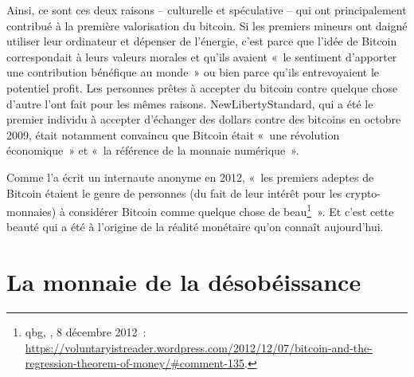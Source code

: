 Ainsi, ce sont ces deux raisons -- culturelle et spéculative -- qui ont principalement contribué à la première valorisation du bitcoin. Si les premiers mineurs ont daigné utiliser leur ordinateur et dépenser de l'énergie, c'est parce que l'idée de Bitcoin correspondait à leurs valeurs morales et qu'ils avaient «~le sentiment d'apporter une contribution bénéfique au monde~» ou bien parce qu'ils entrevoyaient le potentiel profit. Les personnes prêtes à accepter du bitcoin contre quelque chose d'autre l'ont fait pour les mêmes raisons. NewLibertyStandard, qui a été le premier individu à accepter d'échanger des dollars contre des bitcoins en octobre 2009, était notamment convaincu que Bitcoin était «~une révolution économique~» et «~la référence de la monnaie numérique~». %

Comme l'a écrit un internaute anonyme en 2012, «~les premiers adeptes de Bitcoin étaient le genre de personnes (du fait de leur intérêt pour les crypto-monnaies) à considérer Bitcoin comme quelque chose de beau\footnote{qbg, , 8 décembre 2012~: \url{https://voluntaryistreader.wordpress.com/2012/12/07/bitcoin-and-the-regression-theorem-of-money/\#comment-135}.}~». Et c'est cette beauté qui a été à l'origine de la réalité monétaire qu'on connaît aujourd'hui.

\section*{La monnaie de la désobéissance}

